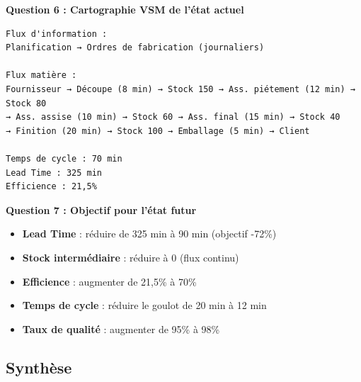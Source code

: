 \documentclass[a4paper,12pt]{article}
\begin{document}
\textbf{Question 6 : Cartographie VSM de l'état actuel}

\begin{center}
\begin{minipage}{0.95\textwidth}
\begin{verbatim}
Flux d'information :
Planification → Ordres de fabrication (journaliers)

Flux matière :
Fournisseur → Découpe (8 min) → Stock 150 → Ass. piétement (12 min) → Stock 80 
→ Ass. assise (10 min) → Stock 60 → Ass. final (15 min) → Stock 40 
→ Finition (20 min) → Stock 100 → Emballage (5 min) → Client

Temps de cycle : 70 min
Lead Time : 325 min
Efficience : 21,5%
\end{verbatim}
\caption{Cartographie VSM - État actuel}
\end{minipage}
\end{center}

\textbf{Question 7 : Objectif pour l'état futur}

\begin{itemize}
    \item \textbf{Lead Time} : réduire de 325 min à 90 min (objectif -72\%)
    \item \textbf{Stock intermédiaire} : réduire à 0 (flux continu)
    \item \textbf{Efficience} : augmenter de 21,5\% à 70\%
    \item \textbf{Temps de cycle} : réduire le goulot de 20 min à 12 min
    \item \textbf{Taux de qualité} : augmenter de 95\% à 98\%
\end{itemize}

\subsection{Synthèse}
\end{document}
